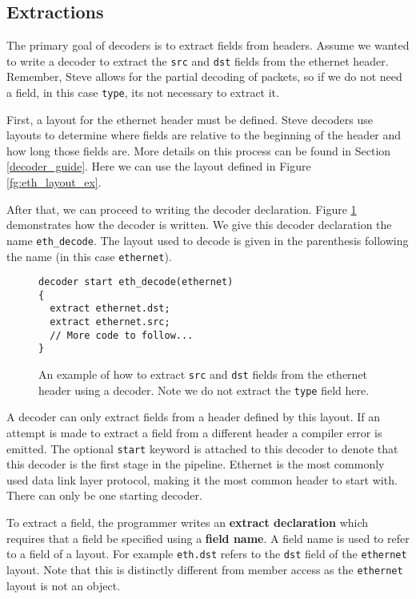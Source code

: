 \subsection{Extractions} \label{decoder_extract_tut}

The primary goal of decoders is to extract fields from headers. Assume we wanted to write a decoder to extract the \texttt{src} and \texttt{dst} fields from the ethernet header. Remember, Steve allows for the partial decoding of packets, so if we do not need a field, in this case \texttt{type}, its not necessary to extract it. 

First, a layout for the ethernet header must be defined. Steve decoders use layouts to determine where fields are relative to the beginning of the header and how long those fields are. More details on this process can be found in Section \ref{decoder_guide}. Here we can use the layout defined in Figure \ref{fg:eth_layout_ex}. 

After that, we can proceed to writing the decoder declaration. Figure \ref{fg:extract_ex} demonstrates how the decoder is written. We give this decoder declaration the name \texttt{eth\_decode}. The layout used to decode is given in the parenthesis following the name (in this case \texttt{ethernet}).

\begin{figure}[ht]
\begin{lstlisting}
decoder start eth_decode(ethernet)
{
  extract ethernet.dst;
  extract ethernet.src;
  // More code to follow...
}
\end{lstlisting}
\caption{An example of how to extract \texttt{src} and \texttt{dst} fields from the ethernet header using a decoder. Note we do not extract the \texttt{type} field here.}
\label{fg:extract_ex}
\end{figure}

A decoder can only extract fields from a header defined by this layout. If an attempt is made to extract a field from a different header a compiler error is emitted. The optional \texttt{start} keyword is attached to this decoder to denote that this decoder is the first stage in the pipeline. Ethernet is the most commonly used data link layer protocol, making it the most common header to start with. There can only be one starting decoder.

To extract a field, the programmer writes an \textbf{extract declaration} which requires that a field be specified using a \textbf{field name}. A field name is used to refer to a field of a layout. For example \texttt{eth.dst} refers to the \texttt{dst} field of the \texttt{ethernet} layout.  Note that this is distinctly different from member access as the \texttt{ethernet} layout is not an object. 

